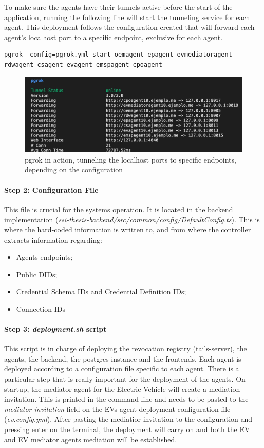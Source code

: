 To make sure the agents have their tunnels active before the start of the application, running the following line will start the tunneling service for each agent. This deployment follows the configuration created that will forward each agent's localhost port to a specific endpoint, exclusive for each agent. 

\begin{lstlisting}
pgrok -config=pgrok.yml start oemagent epagent evmediatoragent rdwagent csagent evagent emspagent cpoagent 
\end{lstlisting}

\begin{figure}[!htb]
    \centering
    \includegraphics[width=0.6\linewidth]{images/pgrok.jpeg}
    \caption{pgrok in action, tunneling the localhost ports to specific endpoints, depending on the configuration}
    \label{fig:pgrok_image}
\end{figure}

\paragraph{Step 2: Configuration File}
This file is crucial for the systems operation. It is located in the backend implementation (\textit{ssi-thesis-backend/src/common/config/DefaultConfig.ts}). This is where the hard-coded information is written to, and from where the controller extracts information regarding:

\begin{itemize}
    \item Agents endpoints;
    \item Public DIDs;
    \item Credential Schema IDs and Credential Definition IDs;
    \item Connection IDs
\end{itemize}

\paragraph{Step 3: \textit{deployment.sh} script}

This script is in charge of deploying the revocation registry (tails-server), the agents, the backend, the postgres instance and the frontends.
Each agent is deployed according to a configuration file specific to each agent.
There is a particular step that is really important for the deployment of the agents. On startup, the mediator agent for the Electric Vehicle will create a mediation-invitation. This is printed in the command line and needs to be pasted to the \textit{mediator-invitation} field on the EVs agent deployment configuration file (\textit{ev.config.yml}). After pasting the mediatior-invitation to the configuration and pressing enter on the terminal, the deployment will carry on and both the EV and EV mediator agents mediation will be established.

